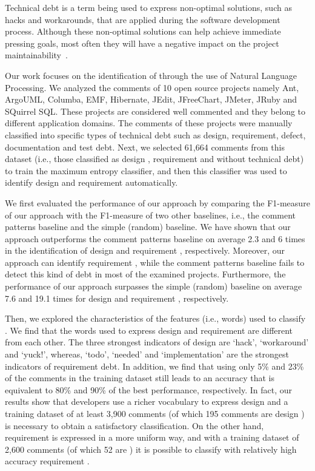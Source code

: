 Technical debt is a term being used to express non-optimal solutions, such as hacks and workarounds, that are applied during the software development process. Although these non-optimal solutions can help achieve immediate pressing goals, most often they will have a negative impact on the project maintainability~\cite{Zazworka2011MTD}. 

Our work focuses on the identification of \SATD through the use of Natural Language Processing. We analyzed the comments of 10 open source projects namely Ant, ArgoUML, Columba, EMF, Hibernate, JEdit, JFreeChart, JMeter, JRuby and SQuirrel SQL. These projects are considered well commented and they belong to different application domains. The comments of these projects were manually classified into specific types of technical debt such as design, requirement, defect, documentation and test debt. Next, we selected 61,664 comments from this dataset (i.e., those classified as design \SATD, requirement \SATD and without technical debt) to train the maximum entropy classifier, and then this classifier was used to identify  design and requirement \SATD automatically.

We first evaluated the performance of our approach by comparing the F1-measure of our approach with the F1-measure of two other baselines, i.e., the comment patterns baseline and the simple (random) baseline. We have shown that our approach outperforms the comment patterns baseline on average 2.3 and 6 times in the identification of design and requirement \SATD, respectively. Moreover, our approach can identify requirement \SATD, while the comment patterns baseline fails to detect this kind of debt in most of the examined projects. Furthermore, the performance of our approach surpasses the simple (random) baseline on average 7.6 and 19.1 times for design and requirement \SATD, respectively. 

Then, we explored the characteristics of the features (i.e., words) used to classify \SATD. We find that the words used to express design and requirement \SATD are different from each other. The three strongest indicators of design \SATD are `hack', `workaround' and `yuck!', whereas, `todo', `needed' and `implementation' are the strongest indicators of requirement debt. In addition, we find that using only 5\% and 23\% of the comments in the training dataset still leads to an accuracy that is equivalent to 80\% and 90\% of the best performance, respectively. In fact, our results show that developers use a richer vocabulary to express design \SATD and a training dataset of at least 3,900 comments (of which 195 comments are design \SATD) is necessary to obtain a satisfactory classification. On the other hand, requirement \SATD is expressed in a more uniform way, and with a training dataset of 2,600 comments (of which 52 are \SATD) it is possible to classify with relatively high accuracy requirement \SATD.

